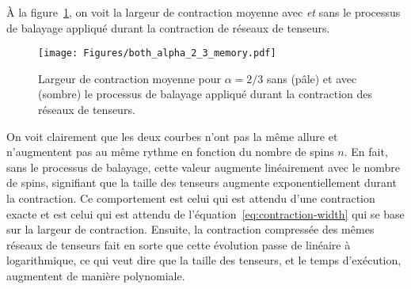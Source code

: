 À la figure~\ref{fig:alpha066_both_memory_curves}, on voit la largeur de contraction moyenne avec \emph{et} sans le processus de balayage appliqué durant la contraction de réseaux de tenseurs.
\begin{figure}[ht]
    \centering
    \texttt{[image: Figures/both\_alpha\_2\_3\_memory.pdf]}
    \caption[Largeur de contraction moyenne pour $\alpha = 2/3$ sans et avec le processus de balayage appliqué durant la contraction des réseaux de tenseurs.]{Largeur de contraction moyenne pour $\alpha = 2/3$ sans (pâle) et avec (sombre) le processus de balayage appliqué durant la contraction des réseaux de tenseurs.}
    \label{fig:alpha066_both_memory_curves}
\end{figure}
On voit clairement que les deux courbes n'ont pas la même allure et n'augmentent pas au même rythme en fonction du nombre de spins $n$.
En fait, sans le processus de balayage, cette valeur augmente linéairement avec le nombre de spins, signifiant que la taille des tenseurs augmente exponentiellement durant la contraction.
Ce comportement est celui qui est attendu d'une contraction exacte et est celui qui est attendu de l'équation~\ref{eq:contraction-width} qui se base sur la largeur de contraction.
Ensuite, la contraction compressée des mêmes réseaux de tenseurs fait en sorte que cette évolution passe de linéaire à logarithmique, ce qui veut dire que la taille des tenseurs, et le temps d'exécution, augmentent de manière polynomiale.

